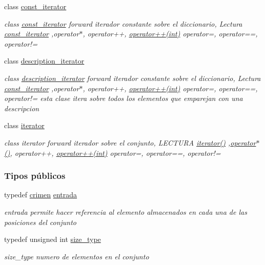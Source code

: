 \begin{DoxyCompactItemize}
class \hyperlink{classconjunto_1_1const__iterator}{const\-\_\-iterator}
\begin{DoxyCompactList}\small\item\em class \hyperlink{classconjunto_1_1const__iterator}{const\-\_\-iterator} forward iterador constante sobre el diccionario, Lectura \hyperlink{classconjunto_1_1const__iterator}{const\-\_\-iterator} ,operator$\ast$, operator++, \hyperlink{classconjunto_1_1const__iterator_a2cd2caa5e80305a5cfd5e49fc4179b63}{operator++(int)} operator=, operator==, operator!= \end{DoxyCompactList}\item 
class \hyperlink{classconjunto_1_1description__iterator}{description\-\_\-iterator}
\begin{DoxyCompactList}\small\item\em class \hyperlink{classconjunto_1_1description__iterator}{description\-\_\-iterator} forward iterador constante sobre el diccionario, Lectura \hyperlink{classconjunto_1_1const__iterator}{const\-\_\-iterator} ,operator$\ast$, operator++, \hyperlink{classconjunto_1_1description__iterator_a64fc4430bdd907e7ee03992c77f419af}{operator++(int)} operator=, operator==, operator!= esta clase itera sobre todos los elementos que emparejan con una descripcion \end{DoxyCompactList}\item 
class \hyperlink{classconjunto_1_1iterator}{iterator}
\begin{DoxyCompactList}\small\item\em class iterator forward iterador sobre el conjunto, L\-E\-C\-T\-U\-R\-A \hyperlink{classconjunto_1_1iterator_ae3ade272e78f6888c39ad44a8b4b152a}{iterator()} ,\hyperlink{classconjunto_1_1iterator_af2e4902c07e0f553fd69a1d1ebf00529}{operator$\ast$()}, operator++, \hyperlink{classconjunto_1_1iterator_af678148966f3d71b566a390e453f401d}{operator++(int)} operator=, operator==, operator!= \end{DoxyCompactList}\end{DoxyCompactItemize}
\subsubsection*{Tipos públicos}
\begin{DoxyCompactItemize}
\item 
typedef \hyperlink{classcrimen}{crimen} \hyperlink{classconjunto_a09cad766dd65de73e51eae21f9d22585}{entrada}
\begin{DoxyCompactList}\small\item\em entrada permite hacer referencia al elemento almacenados en cada una de las posiciones del conjunto \end{DoxyCompactList}\item 
typedef unsigned int \hyperlink{classconjunto_a855a5893bb0f5a851ab2dbf2b8aa6cc7}{size\-\_\-type}
\begin{DoxyCompactList}\small\item\em size\-\_\-type numero de elementos en el conjunto \end{DoxyCompactList}\end{DoxyCompactItemize}
